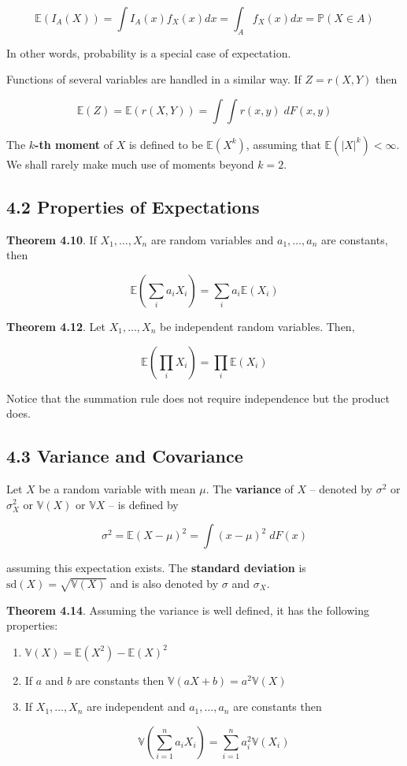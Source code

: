 \[ \mathbb{E}(I_A(X)) = \int I_A(x) f_X(x) dx = \int_A f_X(x) dx = \mathbb{P}(X \in A) \]

In other words, probability is a special case of expectation.

Functions of several variables are handled in a similar way. If
\(Z = r(X, Y)\) then

\[ \mathbb{E}(Z) = \mathbb{E}(r(X, Y)) = \int \int r(x, y) \; dF(x, y) \]

The \textbf{\(k\)-th moment} of \(X\) is defined to be
\(\mathbb{E}(X^{k})\), assuming that \(\mathbb{E}(|X|^{k}) < \infty\). We
shall rarely make much use of moments beyond \(k = 2\).

\subsection*{4.2 Properties of
Expectations}\label{properties-of-expectations}

\textbf{Theorem 4.10}. If \(X_{1}, \dots, X_{n}\) are random variables and
\(a_{1}, \dots, a_{n}\) are constants, then

\[ \mathbb{E}\left( \sum_{i} a_{i} X_{i} \right) = \sum_{i} a_{i} \mathbb{E}(X_{i}) \]

\textbf{Theorem 4.12}. Let \(X_{1}, \dots, X_{n}\) be independent random
variables. Then,

\[ \mathbb{E}\left(\prod_{i} X_{i} \right) = \prod_{i} \mathbb{E}(X_{i}) \]

Notice that the summation rule does not require independence but the
product does.

\subsection*{4.3 Variance and
Covariance}\label{variance:covariance}

Let \(X\) be a random variable with mean \(\mu\). The \textbf{variance}
of \(X\) -- denoted by \(\sigma^{2}\) or \(\sigma_X^{2}\) or
\(\mathbb{V}(X)\) or \(\mathbb{V}X\) -- is defined by

\[ \sigma^{2} = \mathbb{E}(X - \mu)^{2} = \int (x - \mu)^{2}\; dF(x) \]

assuming this expectation exists. The \textbf{standard deviation} is
\(\text{sd}(X) = \sqrt{\mathbb{V}(X)}\) and is also denoted by
\(\sigma\) and \(\sigma_X\).

\textbf{Theorem 4.14}. Assuming the variance is well defined, it has the
following properties:

\begin{enumerate}[label={\arabic*.}]
\item
  \(\mathbb{V}(X) = \mathbb{E}(X^{2}) - \mathbb{E}(X)^{2}\)
\item
  If \(a\) and \(b\) are constants then
  \(\mathbb{V}(aX + b) = a^{2} \mathbb{V}(X)\)
\item
  If \(X_{1}, \dots, X_{n}\) are independent and \(a_{1}, \dots, a_{n}\) are
  constants then

  \[ \mathbb{V}\left( \sum_{i=1}^{n} a_{i}X_{i} \right) = \sum_{i=1}^{n} a_{i}^{2} \mathbb{V}(X_{i}) \]
\end{enumerate}

